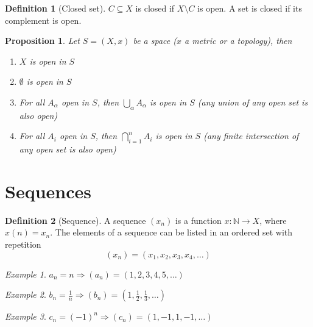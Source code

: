 \documentclass{article}
\newcommand{\Ar}{\Rightarrow}
\newenvironment{enumrom}{\begin{enumerate}[label=(\roman*)]}{\end{enumerate}}
\newcommand{\fr}[2]{\frac{#1}{#2}}
\newcommand{\f}[3]{#1 : #2 \rightarrow #3}
\theoremstyle{definition}
\newtheorem{definition}{Definition}[section]
\theoremstyle{definition}
\theoremstyle{plain}
\theoremstyle{plain}
\theoremstyle{plain}
\theoremstyle{plain}
\newtheorem{proposition}[theorem]{Proposition}
\theoremstyle{definition}
\theoremstyle{remark}
\newtheorem{exampled}{Example}[definition]
\theoremstyle{remark}
\theoremstyle{remark}
\theoremstyle{remark}
\newcommand{\N}{\mathbb{N}}
\begin{document}
\begin{definition}[Closed set]
  $C \subseteq X$ is closed if $X\setminus C$ is open. A set is closed if its complement is open.
\end{definition}


\begin{proposition}
  Let $S = (X, x)$ be a space ($x$ a metric or a topology), then
  \begin{enumrom}
  \item $X$ is open in $S$
  \item $\emptyset$ is open in $S$
  \item For all $A_\alpha$ open in $S$, then $\displaystyle \bigcup_\alpha A_\alpha$ is open in $S$ (any union of any open set is also open)
  \item For all $A_i$ open in $S$, then $\displaystyle \bigcap_{i=1}^n A_i$ is open in $S$ (any finite intersection of any open set is also open)
  \end{enumrom}
\end{proposition}


\newpage
\section{Sequences}


\begin{definition}[Sequence]
  A sequence $(x_n)$ is a function $\f{x}{\N}{X}$, where $x(n) = x_n$. The elements of a sequence can be listed in an ordered set with repetition
  \[
  (x_n) = (x_1, x_2, x_3, x_4, \hdots)
  \]
\end{definition}

\begin{exampled}
  $a_n = n \Ar (a_n) = (1, 2, 3, 4, 5, \hdots)$
\end{exampled}

\begin{exampled}
  $b_n = \fr{1}{n} \Ar (b_n) = (1, \fr{1}{2}, \fr{1}{3}, \hdots)$
\end{exampled}

\begin{exampled}
  $c_n = (-1)^n \Ar (c_n) = (1, -1, 1, -1, \hdots)$
\end{exampled}
\end{document}
